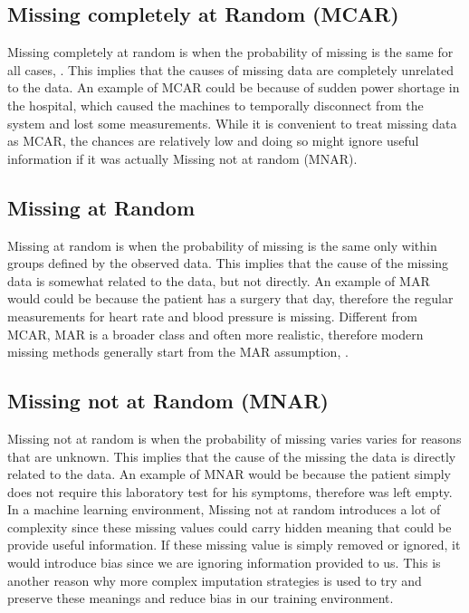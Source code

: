 \documentclass{l4proj}
\begin{document}
\subsection{Missing completely at Random (MCAR)}

Missing completely at random is when the probability of missing is the same for all cases, \cite{buuren_2021}. This implies that the causes of missing data are completely unrelated to the data. An example of MCAR could be because of sudden power shortage in the hospital, which caused the machines to temporally disconnect from the system and lost some measurements. While it is convenient to treat missing data as MCAR, the chances are relatively low and doing so might ignore useful information if it was actually Missing not at random (MNAR).

\subsection{Missing at Random }

Missing at random is when the probability of missing is the same only within groups defined by the observed data. This implies that the cause of the missing data is somewhat related to the data, but not directly. An example of MAR would could be because the patient has a surgery that day, therefore the regular measurements for heart rate and blood pressure is missing. Different from MCAR, MAR is a broader class and often more realistic, therefore modern missing methods generally start from the MAR assumption, \cite{buuren_2021}.


\subsection{Missing not at Random (MNAR)}

Missing not at random is when the probability of missing varies varies for reasons that are unknown. This implies that the cause of the missing the data is directly related to the data. An example of MNAR would be because the patient simply does not require this laboratory test for his symptoms, therefore was left empty. In a machine learning environment, Missing not at random introduces a lot of complexity since these missing values could carry hidden meaning that could be provide useful information. If these missing value is simply removed or ignored, it would introduce bias since we are ignoring information provided to us. This is another reason why more complex imputation strategies is used to try and preserve these meanings and reduce bias in our training environment.
\end{document}
